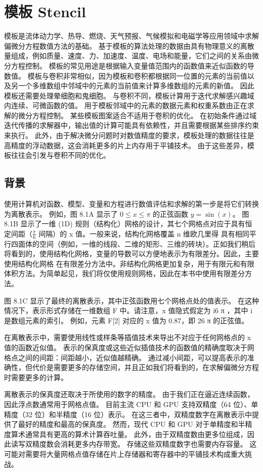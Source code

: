 \section{模板 Stencil}
模板是流体动力学、热导、燃烧、天气预报、气候模拟和电磁学等应用领域中求解偏微分方程数值方法的基础。 基于模板的算法处理的数据由具有物理意义的离散量组成，例如质量、速度、力、加速度、温度、电场和能量，它们之间的关系由微分方程控制。 模板的常见用途是根据输入变量值范围内的函数值来近似函数的导数值。 模板与卷积非常相似，因为模板和卷积都根据同一位置的元素的当前值以及另一个多维数组中邻域中的元素的当前值来计算多维数组的元素的新值。 因此模板还需要处理晕细胞和鬼细胞。 与卷积不同，模板计算用于迭代求解感兴趣域内连续、可微函数的值。 用于模板邻域中的元素的数据元素和权重系数由正在求解的微分方程控制。 某些模板图案适合不适用于卷积的优化。 在初始条件通过域迭代传播的求解器中，输出值的计算可能具有依赖性，并且需要根据某些排序约束来执行。 此外，由于解决微分问题时对数值精度的要求，模板处理的数据往往是高精度的浮动数据，这会消耗更多的片上内存用于平铺技术。 由于这些差异，模板往往会引发与卷积不同的优化。

\subsection{背景}
使用计算机对函数、模型、变量和方程进行数值评估和求解的第一步是将它们转换为离散表示。 例如，图 8.1A 显示了 $0 \leq x \leq \pi$ 的正弦函数 $y = \sin(x)$。 图 8.1B 显示了一维 (1D) 规则（结构化）网格的设计，其七个网格点对应于具有恒定间距（$\frac{\pi}{6}$ 间隔）的 x 值。一般来说，结构化网格覆盖 n 维欧几里得 具有相同平行四面体的空间（例如，一维的线段、二维的矩形、三维的砖块）。正如我们稍后将看到的，使用结构化网格，变量的导数可以方便地表示为有限差分。因此，主要使用结构化网格 在有限差分方法中。非结构化网格更加复杂，用于有限元和有限体积方法。为简单起见，我们将仅使用规则网格，因此在本书中使用有限差分方法。

图 8.1C 显示了最终的离散表示，其中正弦函数用七个网格点处的值表示。 在这种情况下，表示形式存储在一维数组 F 中。请注意，x 值隐式假定为 i6 π ，其中 i 是数组元素的索引。 例如，元素 F[2] 对应的 x 值为 0.87，即 26 π 的正弦值。

在离散表示中，需要使用线性或样条等插值技术来导出不对应于任何网格点的 x 值的函数近似值。 表示的保真度或这些近似插值技术的函数值的精确度取决于网格点之间的间距：间距越小，近似值越精确。 通过减小间距，可以提高表示的准确性，但代价是需要更多的存储空间，并且正如我们将看到的，在求解偏微分方程时需要更多的计算。

离散表示的保真度还取决于所使用的数字的精度。 由于我们正在逼近连续函数，因此浮点数通常用于网格点值。 目前主流 CPU 和 GPU 支持双精度（64 位）、单精度（32 位）和半精度（16 位）表示。 在这三者中，双精度数字在离散表示中提供了最好的精度和最高的保真度。 然而，现代 CPU 和 GPU 对于单精度和半精度算术通常具有更高的算术计算吞吐量。 此外，由于双精度数由更多位组成，因此读写双精度数会消耗更多内存带宽。 存储这些双精度数字也需要内存容量。 这可能对需要将大量网格点值存储在片上存储器和寄存器中的平铺技术构成重大挑战。


